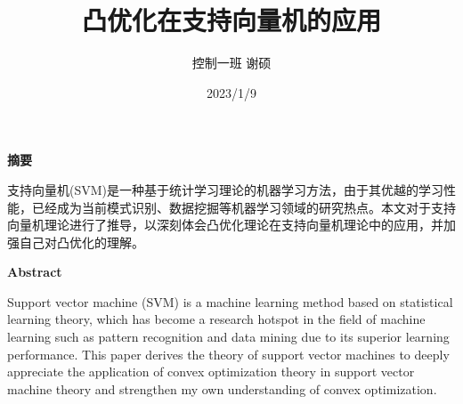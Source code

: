 \documentclass[12pt,a4paper]{article}%
\title{\fontsize{18pt}{27pt}\selectfont%
	{\heiti%
		凸优化在支持向量机的应用}}%
\date{}%
\begin{document}
	\maketitle%
	\lhead{}%
	\chead{}%
	\rhead{}%
	\lfoot{}%
	\cfoot{\thepage}%
	\rfoot{}%

	\begin{center}%
		
		\author{ 控制一班 谢硕 }
		
		\date{2023/1/9}
		
		
		
		{\textbf{摘要}}%
	\end{center}
	\begin{adjustwidth}{1.06cm}{1.06cm}%
		\hspace{1.5em}支持向量机(SVM)是一种基于统计学习理论的机器学习方法，由于其优越的学习性能，已经成为当前模式识别、数据挖掘等机器学习领域的研究热点。本文对于支持向量机理论进行了推导，以深刻体会凸优化理论在支持向量机理论中的应用，并加强自己对凸优化的理解。
		
	\end{adjustwidth}
	\begin{center}
		\large{\textbf{Abstract}}
	\end{center}
	
	\begin{adjustwidth}{1cm}{1cm}
		\hspace{1.5em}Support vector machine (SVM) is a machine learning method based on statistical learning theory, which has become a research hotspot in the field of machine learning such as pattern recognition and data mining due to its superior learning performance. This paper derives the theory of support vector machines to deeply appreciate the application of convex optimization theory in support vector machine theory and strengthen my own understanding of convex optimization.
	\end{adjustwidth}
	\thispagestyle{empty}       %
	\newpage
	\begin{center}
	\tableofcontents	
	\end{center}
\end{document}
